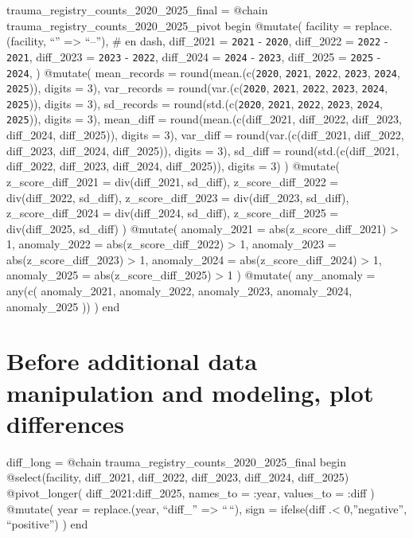 \documentclass[
  12pt,
  letterpaper,
  DIV=11,
  numbers=noendperiod]{scrartcl}
\begin{document}
trauma\_registry\_counts\_2020\_2025\_final = @chain
trauma\_registry\_counts\_2020\_2025\_pivot begin @mutate( facility =
replace.(facility, ``'' =\textgreater{} ``--''), \# en dash,
diff\_2021 = \texttt{2021} - \texttt{2020}, diff\_2022 = \texttt{2022} -
\texttt{2021}, diff\_2023 = \texttt{2023} - \texttt{2022}, diff\_2024 =
\texttt{2024} - \texttt{2023}, diff\_2025 = \texttt{2025} -
\texttt{2024}, ) @mutate( mean\_records = round(mean.(c(\texttt{2020},
\texttt{2021}, \texttt{2022}, \texttt{2023}, \texttt{2024},
\texttt{2025})), digits = 3), var\_records = round(var.(c(\texttt{2020},
\texttt{2021}, \texttt{2022}, \texttt{2023}, \texttt{2024},
\texttt{2025})), digits = 3), sd\_records = round(std.(c(\texttt{2020},
\texttt{2021}, \texttt{2022}, \texttt{2023}, \texttt{2024},
\texttt{2025})), digits = 3), mean\_diff = round(mean.(c(diff\_2021,
diff\_2022, diff\_2023, diff\_2024, diff\_2025)), digits = 3), var\_diff
= round(var.(c(diff\_2021, diff\_2022, diff\_2023, diff\_2024,
diff\_2025)), digits = 3), sd\_diff = round(std.(c(diff\_2021,
diff\_2022, diff\_2023, diff\_2024, diff\_2025)), digits = 3) ) @mutate(
z\_score\_diff\_2021 = div(diff\_2021, sd\_diff), z\_score\_diff\_2022 =
div(diff\_2022, sd\_diff), z\_score\_diff\_2023 = div(diff\_2023,
sd\_diff), z\_score\_diff\_2024 = div(diff\_2024, sd\_diff),
z\_score\_diff\_2025 = div(diff\_2025, sd\_diff) ) @mutate(
anomaly\_2021 = abs(z\_score\_diff\_2021) \textgreater{} 1,
anomaly\_2022 = abs(z\_score\_diff\_2022) \textgreater{} 1,
anomaly\_2023 = abs(z\_score\_diff\_2023) \textgreater{} 1,
anomaly\_2024 = abs(z\_score\_diff\_2024) \textgreater{} 1,
anomaly\_2025 = abs(z\_score\_diff\_2025) \textgreater{} 1 ) @mutate(
any\_anomaly = any(c( anomaly\_2021, anomaly\_2022, anomaly\_2023,
anomaly\_2024, anomaly\_2025 )) ) end

\section{Before additional data manipulation and modeling, plot
differences}\label{before-additional-data-manipulation-and-modeling-plot-differences}

diff\_long = @chain trauma\_registry\_counts\_2020\_2025\_final begin
@select(facility, diff\_2021, diff\_2022, diff\_2023, diff\_2024,
diff\_2025) @pivot\_longer( diff\_2021:diff\_2025, names\_to = :year,
values\_to = :diff ) @mutate( year = replace.(year, ``diff\_''
=\textgreater{} ``\,``), sign = ifelse(diff .\textless{} 0,''negative'',
``positive'') ) end
\end{document}
